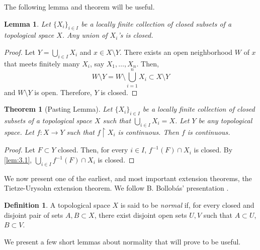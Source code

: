\documentclass[openany, amssymb, psamsfonts]{amsart}
\let\fullref\autoref
\newtheorem{thm}{Theorem}[section]
\newtheorem{lem}{Lemma}[section]
\theoremstyle{definition}
\newtheorem{defn}{Definition}[section]
\numberwithin{equation}{section}
\begin{document}
The following lemma and theorem will be useful.
\begin{lem}\label{lem:3.1}
  Let $\{X_i\}_{i\in I}$ be a locally finite collection of closed subsets of a topological space $X$. Any union of $X_i$'s is closed.
\end{lem}
\begin{proof}[Proof]
  Let $Y = \bigcup_{i\in I} X_i$ and $x\in X \setminus Y$. There exists an open neighborhood $W$ of $x$ that meets finitely many $X_i$, say $X_1, \ldots, X_n$. Then, 
  $$W \setminus Y = W \setminus \bigcup_{i=1}^n X_i \subset X \setminus Y$$ and $W\setminus Y$ is open. Therefore, $Y$ is closed.
\end{proof}
\begin{thm}[Pasting Lemma] \label{thm:3.2}
  Let $\{X_i\}_{i\in I}$ be a locally finite collection of closed subsets of a topological space $X$ such that $\bigcup_{i\in I} X_i = X$. Let $Y$ be any topological space. Let $f: X\to Y$ such that $f\restriction X_i$ is continuous. Then $f$ is continuous. 
\end{thm}
\begin{proof}[Proof]
  Let $F \subset Y$ closed. Then, for every $i\in I$, $f^{-1}(F) \cap X_i$ is closed. By \fullref{lem:3.1}, $\bigcup_{i\in I}f^{-1}(F) \cap X_i$ is closed.
\end{proof}

We now present one of the earliest, and most important extension theorems, the Tietze-Urysohn extension theorem. We follow B. Bollob{\'a}s' presentation \cite{bollobas}. 

\begin{defn}
  A topological space $X$ is said to be \emph{normal} if, for every closed and disjoint pair of sets $A, B \subset X$, there exist disjoint open sets $U, V$ such that $A \subset U$, $B \subset V$.
\end{defn}

We present a few short lemmas about normality that will prove to be useful. 
\end{document}
